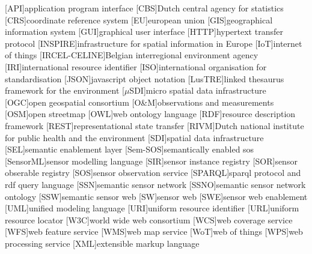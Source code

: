 
\begin{acronym}[UML]
  [API]{application program interface}
  [CBS]{Dutch central agency for statistics}
  [CRS]{coordinate reference system} 
  [EU]{european union}
  [GIS]{geographical information system}
  [GUI]{graphical user interface}
  [HTTP]{hypertext transfer protocol}
  [INSPIRE]{infrastructure for spatial information in Europe}
  [IoT]{internet of things}
  [IRCEL-CELINE]{Belgian interregional environment agency}
  [IRI]{international resource identifier}
  [ISO]{international organisation for standardisation}
  [JSON]{javascript object notation}
  [LusTRE]{linked thesaurus framework for the environment} 
  [$\mu$SDI]{micro spatial data infrastructure}
  [OGC]{open geospatial consortium}
  [O\&M]{observations and measurements}
  [OSM]{open streetmap}
  [OWL]{web ontology language}
  [RDF]{resource description framework}
  [REST]{representational state transfer}
  [RIVM]{Dutch national institute for public health and the environment}
  [SDI]{spatial data infrastructure}
  [SEL]{semantic enablement layer}
  [Sem-SOS]{semantically enabled sos}
  [SensorML]{sensor modelling language}
  [SIR]{sensor instance registry}
  [SOR]{sensor obserable registry}
  [SOS]{sensor observation service}
  [SPARQL]{sparql protocol and rdf query language}
  [SSN]{semantic sensor network}
  [SSNO]{semantic sensor network ontology}
  [SSW]{semantic sensor web}
  [SW]{sensor web}
  [SWE]{sensor web enablement}
  [UML]{unified modeling language}
  [URI]{uniform resource identifier}
  [URL]{uniform resource locator}
  [W3C]{world wide web consortium}
  [WCS]{web coverage service}
  [WFS]{web feature service}
  [WMS]{web map service}
  [WoT]{web of things}
  [WPS]{web processing service}
  [XML]{extensible markup language}
\end{acronym}